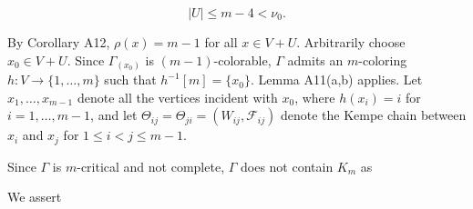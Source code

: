 $$|U| \leq m - 4 < \nu_0.$$

By Corollary A12, $\rho(x) = m - 1$ for all $x \in V + U$. Arbitrarily choose $x_0 \in V + U$. Since $\Gamma_{(x_0)}$ is $(m - 1)$-colorable, $\Gamma$ admits an $m$-coloring $h: V \rightarrow \{1, \ldots, m\}$ such that $h^{-1}[m] = \{x_0\}$. Lemma A11(a,b) applies. Let $x_1, \ldots, x_{m-1}$ denote all the vertices incident with $x_0$, where $h(x_i) = i$ for $i = 1, \ldots, m - 1$, and let $\Theta_{ij} = \Theta_{ji} = (W_{ij}, \mathcal{F}_{ij})$ denote the Kempe chain between $x_i$ and $x_j$ for $1 \leq i < j \leq m - 1$.

Since $\Gamma$ is $m$-critical and not complete, $\Gamma$ does not contain $K_m$ as

We assert
